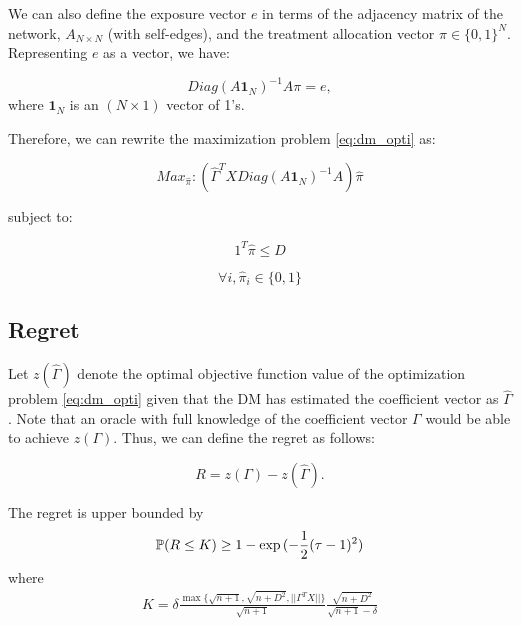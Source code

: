 \documentclass[12pt,a4paper]{article}
\begin{document}
We can also define the exposure vector $e$ in terms of the adjacency matrix of the network, $A_{N \times N}$ (with self-edges), and the treatment allocation vector $\pi \in \{0,1\}^N$.\\

Representing $e$ as a vector, we have: 

$$Diag(A \mathbf{1}_{N} ) ^{-1} A\pi  = e,$$
where $\mathbf{1}_{N}$ is an $(N \times 1)$ vector of 1's.

Therefore, we can rewrite the maximization problem \eqref{eq:dm_opti} as:

$$Max_{\hat \pi}: \left(\hat \Gamma^T X Diag(A \mathbf{1}_{N} ) ^{-1} A \right) \hat \pi  $$

subject to: 

$$1^T \hat \pi \leq D $$

$$\forall i, \hat \pi_i \in \{0,1\} $$


\iffalse
or, we can write: %

$$Max_{\hat \pi, y_i}: E \left( \left(\hat \Gamma^T X Diag(A \mathbf{1}_{N} ) ^{-1} A \right) \hat \pi  - \sum_{i \leq N} y_i \right)$$ subject to: 

$$\forall i,  \left( Diag(A \mathbf{1}_{N} ) ^{-1} A \hat \pi \right)_i \leq y_i$$

$$\forall i, y_i, \hat \pi_i \in \{0,1\} $$
\fi

\subsection{Regret}
Let $z(\hat \Gamma)$ denote the optimal objective function value of the optimization problem \eqref{eq:dm_opti} given that the DM has estimated the coefficient vector as $\hat{\Gamma} $. Note that an oracle with full knowledge of the coefficient vector $\Gamma$ would be able to achieve $z(\Gamma)$. Thus, we can define the regret as follows:

$$R = z(\Gamma) - z(\hat{\Gamma}) .$$

\begin{thm}
The regret is upper bounded by
\begin{align}
\mathbb{P}(R \leq K) \geq 1 - \exp{(-\frac{1}{2} (\tau -1 )^2 )}
\end{align}
where
\begin{align}
K = \delta \frac{ \max \{ \sqrt{n+1}, \sqrt{n+D^2}, || \Gamma^T X || \} }{ \sqrt{n+1} } \frac{ \sqrt{n+D^2} }{\sqrt{n+1} - \delta }
\end{align}

\end{thm}
\end{document}
